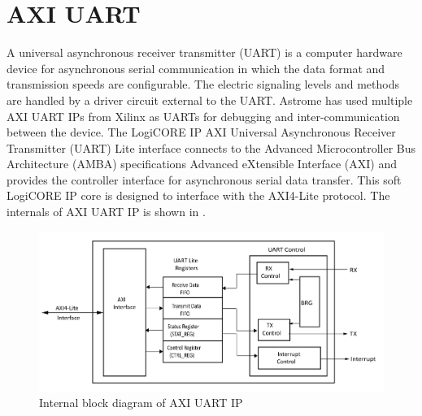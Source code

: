 \section{AXI UART}

A universal asynchronous receiver transmitter (UART) is a computer hardware device for asynchronous serial communication in which the data format and transmission speeds are configurable. The electric signaling levels and methods are handled by a driver circuit external to the UART. Astrome has used multiple AXI UART IPs from Xilinx as UARTs for debugging and inter-communication between the device. The LogiCORE IP AXI Universal Asynchronous Receiver Transmitter (UART) Lite interface connects to the Advanced Microcontroller Bus Architecture (AMBA) specification\textquotesingle s Advanced eXtensible Interface (AXI) and provides the controller interface for asynchronous serial data transfer. This soft LogiCORE IP core is designed to interface with the AXI4-Lite protocol. The internals of AXI UART IP is shown in .

\begin{figure}[H]
\begin{center}
\includegraphics[width=\textwidth]{images/UART.png}
\caption{Internal block diagram of AXI UART IP}
\label{UART}
\end{center}
\end{figure}